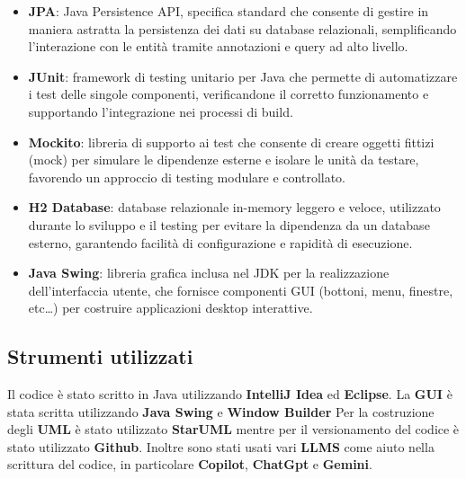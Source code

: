 \begin{itemize}
    \item \textbf{JPA}: Java Persistence API, specifica standard che consente di gestire in maniera astratta la 
    persistenza dei dati su database relazionali, semplificando l'interazione con le entità tramite annotazioni 
    e query ad alto livello.
    
    \item \textbf{JUnit}: framework di testing unitario per Java che permette di automatizzare i test delle singole
     componenti, verificandone il corretto funzionamento e supportando l'integrazione nei processi di build.
    
    \item \textbf{Mockito}: libreria di supporto ai test che consente di creare oggetti fittizi (mock) per simulare 
    le dipendenze esterne e isolare le unità da testare, favorendo un approccio di testing modulare e controllato.
    
    \item \textbf{H2 Database}: database relazionale in-memory leggero e veloce, utilizzato durante lo sviluppo e il 
    testing per evitare la dipendenza da un database esterno, garantendo facilità di configurazione e rapidità di esecuzione.
    
    \item \textbf{Java Swing}: libreria grafica inclusa nel JDK per la realizzazione dell'interfaccia utente, 
    che fornisce componenti GUI (bottoni, menu, finestre, etc\dots) per costruire applicazioni desktop interattive.

\end{itemize}

\subsection{Strumenti utilizzati}
Il codice è stato scritto in Java utilizzando \textbf{IntelliJ Idea} ed \textbf{Eclipse}.
La \textbf{GUI} è stata scritta utilizzando \textbf{Java Swing} e \textbf{Window Builder} %
Per la costruzione degli \textbf{UML} è stato utilizzato \textbf{StarUML} mentre per il versionamento
del codice è stato utilizzato \textbf{Github}. Inoltre sono stati usati vari \textbf{LLMS} come 
aiuto nella scrittura del codice, in particolare \textbf{Copilot}, \textbf{ChatGpt} e \textbf{Gemini}.